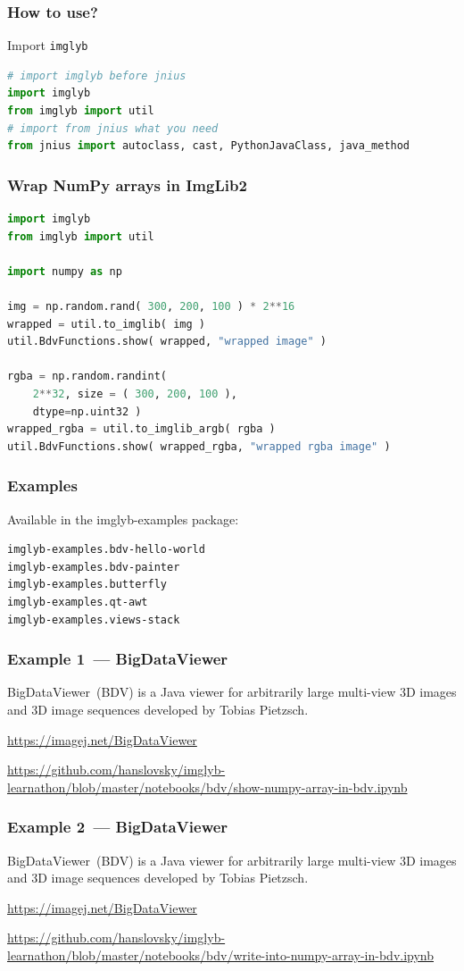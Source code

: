 \documentclass[%
]{beamer}
\newcommand{\urlScrSz}[1]{\scriptsize\url{#1}}
\begin{document}
\begin{frame}[fragile]
    \frametitle{How to use?}
Import \lstinline[language=python,basicstyle=\ttfamily\normalsize]{imglyb}
    \begin{lstlisting}[language=python]
# import imglyb before jnius
import imglyb
from imglyb import util
# import from jnius what you need
from jnius import autoclass, cast, PythonJavaClass, java_method
    \end{lstlisting}
\end{frame}

\begin{frame}[fragile]
    \frametitle{Wrap NumPy arrays in ImgLib2}
    \begin{lstlisting}[language=python]
import imglyb
from imglyb import util

import numpy as np

img = np.random.rand( 300, 200, 100 ) * 2**16
wrapped = util.to_imglib( img )
util.BdvFunctions.show( wrapped, "wrapped image" )

rgba = np.random.randint( 
    2**32, size = ( 300, 200, 100 ), 
    dtype=np.uint32 )
wrapped_rgba = util.to_imglib_argb( rgba )
util.BdvFunctions.show( wrapped_rgba, "wrapped rgba image" )
    \end{lstlisting}

\end{frame}

\begin{frame}[fragile]
    \frametitle{Examples}
    Available in the imglyb-examples package:
    \begin{lstlisting}[language=bash]
imglyb-examples.bdv-hello-world
imglyb-examples.bdv-painter
imglyb-examples.butterfly
imglyb-examples.qt-awt
imglyb-examples.views-stack
    \end{lstlisting}
\end{frame}

\begin{frame}
    \frametitle{Example 1~--- BigDataViewer}
    BigDataViewer~(BDV) is a Java viewer for arbitrarily large multi-view 3D images and 3D image
    sequences developed by Tobias Pietzsch.
    
    \urlScrSz{https://imagej.net/BigDataViewer}
    
    \urlScrSz{https://github.com/hanslovsky/imglyb-learnathon/blob/master/notebooks/bdv/show-numpy-array-in-bdv.ipynb}
\end{frame}

\begin{frame}
    \frametitle{Example 2~--- BigDataViewer}
    BigDataViewer~(BDV) is a Java viewer for arbitrarily large multi-view 3D images and 3D image
    sequences developed by Tobias Pietzsch.
    
    \urlScrSz{https://imagej.net/BigDataViewer}
    
    \urlScrSz{https://github.com/hanslovsky/imglyb-learnathon/blob/master/notebooks/bdv/write-into-numpy-array-in-bdv.ipynb}
\end{frame}
\end{document}
